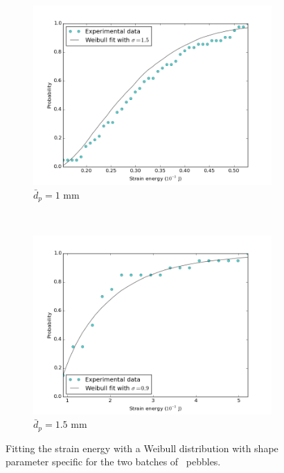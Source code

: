 \begin{figure}
        \centering
        \begin{subfigure}[b]{\doubleimagewidth}
                \includegraphics[width=\textwidth]{chapters/figures/nfri-1mm-w-cdf-fit.png}
                \caption{$\bar{d}_p = 1$ mm}
                \label{fig:nfri-1-w-cdf}
        \end{subfigure}
        ~
        \begin{subfigure}[b]{\doubleimagewidth}
                \includegraphics[width=\textwidth]{chapters/figures/nfri-1.5mm-w-cdf-fit.png}
                \caption{$\bar{d}_p = 1.5$ mm}
                \label{fig:nfri-1.5-w-cdf}
        \end{subfigure}
        \caption{Fitting the strain energy with a Weibull distribution with shape parameter specific for the two batches of \lit~pebbles.}\label{fig:nfri-w-cdf}
\end{figure}

